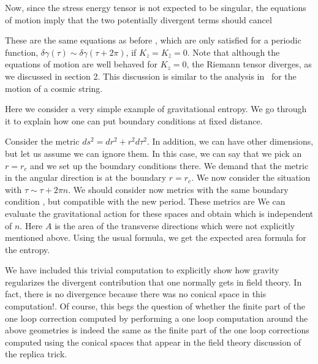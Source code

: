  Now, since the stress energy tensor is not expected to be singular,  the equations of motion
 imply that the     two potentially divergent terms should cancel
\eqn{}

These are the same equations as before \condc , which are only satisfied for  a periodic function,
$\delta \gamma(\tau) \sim \delta \gamma (\tau+2\pi)$, if $K_z=K_{\bar{z}}=0$. Note that although the equations of motion are well behaved for $K_z=0$, the Riemann tensor diverges, as we discussed in section 2. This discussion is similar
to the analysis in \UnruhHY\ for the motion of a cosmic string.




Here we consider a very simple example of gravitational entropy. We go through it to explain how one
can put boundary conditions at fixed distance.

Consider the metric  $ds^2 = dr^2 + r^2 d\tau^2 $.
In addition, we can have other dimensions, but let us assume we can ignore them.
In this case,  we can say that we pick an $r=r_c$ and we set up the boundary conditions there. We demand
that the metric in the angular direction is
\eqn{}
at the boundary $r=r_c$. We now consider the situation with $\tau \sim \tau + 2 \pi n$.
We should consider now metrics with the same boundary condition \bdcd , but compatible with the new period.
These metrics are
\eqn{}
We can evaluate the gravitational action for these spaces and obtain
\eqn{}
which is independent of $n$. Here $A$ is the area of the transverse directions which were not explicitly mentioned above.
Using the usual formula, we get the expected area formula for the entropy.

We have included this trivial computation to explicitly show how gravity regularizes the divergent contribution that
one normally gets in field theory. In fact, there is no divergence because there was no conical space in this
computation!. Of course, this begs the question of whether the finite part of the
one loop correction computed by performing a one
loop computation around the above geometries is indeed the same as the finite part of the
 one loop corrections computed using the
conical spaces that appear in the field theory discussion of the replica trick.







\listrefs


\bye





